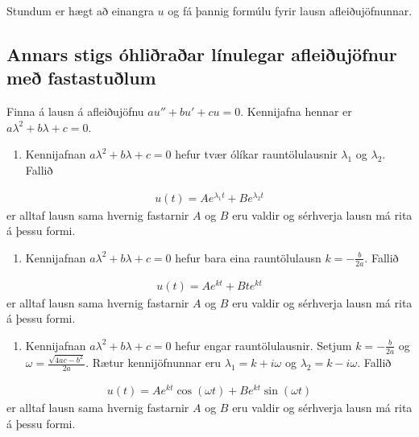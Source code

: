 \documentclass[a4paper,10pt,icelandic]{sphinxmanual}
\begin{document}
Stundum er hægt að einangra \(u\) og fá þannig formúlu fyrir lausn afleiðujöfnunnar.


\subsection{Annars stigs óhliðraðar línulegar afleiðujöfnur með fastastuðlum}
\label{\detokenize{Kafli06:annars-stigs-ohliraar-linulegar-afleiujofnur-me-fastastulum}}
Finna á lausn á afleiðujöfnu \(au''+bu'+cu=0\). Kennijafna hennar er \(a\lambda^2+b\lambda+c=0\).
\begin{enumerate}
%
\item {} 
Kennijafnan \(a\lambda^2+b\lambda+c=0\) hefur tvær ólíkar rauntölulausnir \(\lambda_1\) og \(\lambda_2\). Fallið

\end{enumerate}
\begin{equation*}
\begin{split}u(t)=Ae^{\lambda_1t}+Be^{\lambda_2t}\end{split}
\end{equation*}
er alltaf lausn sama hvernig fastarnir \(A\) og \(B\) eru valdir og sérhverja lausn má rita á þessu formi.
\begin{enumerate}
%
\setcounter{enumi}{1}
\item {} 
Kennijafnan \(a\lambda^2+b\lambda+c=0\) hefur bara eina rauntölulausn \(k=-\frac{b}{2a}\). Fallið

\end{enumerate}
\begin{equation*}
\begin{split}u(t)=Ae^{kt}+Bte^{kt}\end{split}
\end{equation*}
er alltaf lausn sama hvernig fastarnir \(A\) og \(B\) eru valdir og sérhverja lausn má rita á þessu formi.
\begin{enumerate}
%
\setcounter{enumi}{2}
\item {} 
Kennijafnan \(a\lambda^2+b\lambda+c=0\) hefur engar rauntölulausnir. Setjum \(k=-\frac{b}{2a}\) og \(\omega=\frac{\sqrt{4ac-b^2}}{2a}\). Rætur kennijöfnunnar eru \(\lambda_1=k+i\omega\) og \(\lambda_2=k-i\omega\). Fallið

\end{enumerate}
\begin{equation*}
\begin{split}u(t)=Ae^{kt}\cos(\omega t)+Be^{kt}\sin(\omega t)\end{split}
\end{equation*}
er alltaf lausn sama hvernig fastarnir \(A\) og \(B\) eru
valdir og sérhverja lausn má rita á þessu formi.
\end{document}
